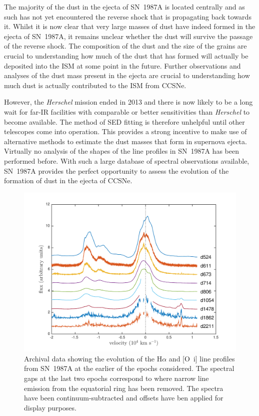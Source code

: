 The majority of the dust in the ejecta of SN~1987A is located centrally and as such has not yet encountered the reverse shock that is propagating back towards it.  Whilst it is now clear that very large masses of dust have indeed formed in the ejecta of SN~1987A, it remains unclear whether the dust will survive the passage of the reverse shock.  The composition of the dust and the size of the grains are crucial to understanding how much of the dust that has formed will actually be deposited into the ISM at some point in the future.  Further observations and analyses of the dust mass present in the ejecta are  crucial to understanding how much dust is actually contributed to the ISM from CCSNe.




 However, the {\em Herschel} mission ended in 2013 and there is now likely to be a long wait for far-IR facilities with comparable or better sensitivities than {\em Herschel} to become available.  The method of SED fitting is therefore unhelpful until other telescopes come into operation.  This provides a strong incentive to make use of alternative methods to estimate the dust masses that form in supernova ejecta.  Virtually no analysis of the shapes of the line profiles in SN~1987A has been performed before.  With such a large database of spectral observations available, SN~1987A provides the perfect opportunity to assess the evolution of the formation of dust in the ejecta of CCSNe.  

\begin{figure}
\centering
\includegraphics[trim =39 10 45 15,clip=true,scale=0.7]{chapters/chapter5/images/Ha_evol_early_1col2.pdf}
\caption{Archival data showing the evolution of the H$\alpha$ and
[O~{\sc i}] line profiles from SN~1987A at the earlier of the epochs considered. The 
spectral gaps at the last two epochs correspond to where narrow line 
emission from the equatorial ring has been removed. The spectra have been
continuum-subtracted and offsets have ben applied for display purposes.}
\label{Ha_evol_early}
\end{figure}

